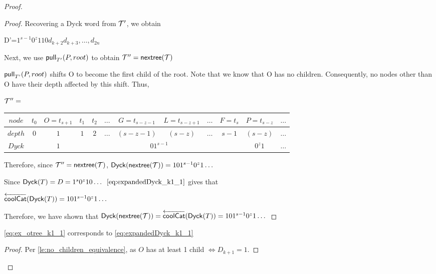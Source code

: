 \begin{proof}
\begin{proof}
    Recovering a Dyck word from $\tree{T}'$, we obtain 

    D'=$1^{s-1}0^z110d_{k+2}d_{k+3},\dots,d_{2n}$


    Next, we use $\poppush[T']{P}{root}$
 to obtain $\tree{T}'' = \nextTree{T}$

    $\poppush[T']{P}{root}$
 shifts O to become the first child of the root. Note that we know that O has no children. Consequently, no nodes other than O have their depth affected by this shift. Thus, 

    \bigskip
    \bigskip


    $\tree{T}''=$
    \begin{center}
	\begin{tabular}{ |c|c|c|c|c|c|c|c|c|c|c|c| } 
	    \hline

	    $node$ & $t_0$ & $O=t_{s+1}$ & $t_1$ & $t_2$ & $\dots$ & $G=t_{s-z-1}$ & $L=t_{s-z+1}$ & $\dots$ & $F=t_s$ & $P=t_{s-z}$ & $\dots$ \\
	    \hline
	    $depth$ & $0$ & $1$ & $1$ & $2$ &$\dots$ & $(s-z-1)$ & $(s-z)$ & $\dots$ & $s-1$ & $(s-z)$   & $\dots$\\
	    \hline
	    $Dyck$ &  & $1$ &  \multicolumn{7}{|c|}{$01^{s-1}$} &  $0^{z}1$   & $\dots$\\
	    \hline
	\end{tabular}
    \end{center}


    \bigskip
    \bigskip




    Therefore, since $\tree{T}''=\nextTree{T}$, $\dyck{\nextTree{T}}=101^{s-1}0^z1\dots$

    Since $\dyck{T}=D=1^s0^{z}10\dots$
    $\ref{eq:expandedDyck_k1_1}$ gives that

    $\coolCat{\dyck{T}}=101^{s-1}0^z1\dots$

    Therefore, we have shown that $\dyck{\nextTree{T}}=\coolCat{\dyck{T}}=101^{s-1}0^z1\dots$

\end{proof}
\begin{lemma}
    \ref{eq:ex_otree_k1_1} corresponds to \ref{eq:expandedDyck_k1_1}
\end{lemma}
\begin{proof}

    Per \ref{le:no_children_equivalence}, as $O$ has at least 1 child $\iff D_{k+1}=1$.


\end{proof}
\end{proof}
